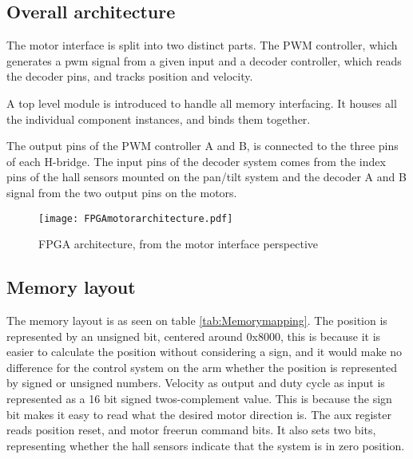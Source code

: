 \subsection{Overall architecture}
The motor interface is split into two distinct parts. The PWM controller, which generates a pwm signal from a given input and a decoder controller, which reads the decoder pins, and tracks position and velocity.

A top level module is introduced to handle all memory interfacing. It houses all the individual component instances, and binds them together.

The output pins of the PWM controller A and B, is connected to the three pins of each H-bridge.
The input pins of the decoder system comes from the index pins of the hall sensors mounted on the pan/tilt system and the decoder A and B signal from the two output pins on the motors.

\begin{figure}[htb]
\centering
\texttt{[image: FPGAmotorarchitecture.pdf]}
\caption{FPGA architecture, from the motor interface perspective}
\label{fig:FPGAMotorArchitecture}
\end{figure}

\subsection{Memory layout}
The memory layout is as seen on table \ref{tab:Memorymapping}. The position is represented by an unsigned bit, centered around 0x8000, this is because it is easier to calculate the position without considering a sign, and it would make no difference for the control system on the arm whether the position is represented by signed or unsigned numbers.
Velocity as output and duty cycle as input is represented as a 16 bit signed twos-complement value.
This is because the sign bit makes it easy to read what the desired motor direction is.
The aux register reads position reset, and motor freerun command bits. It also sets two bits, representing whether the hall sensors indicate that the system is in zero position.



